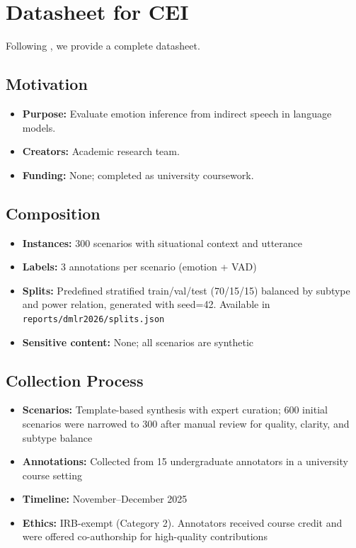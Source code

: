 \documentclass[twoside,11pt]{article}
\begin{document}


\clearpage

\appendix
\section{Datasheet for CEI}
\label{app:datasheet}

Following \citet{gebru2021datasheets}, we provide a complete datasheet.

\subsection{Motivation}
\begin{itemize}[leftmargin=*,noitemsep]
    \item \textbf{Purpose:} Evaluate emotion inference from indirect speech in language models.
    \item \textbf{Creators:} Academic research team.
    \item \textbf{Funding:} None; completed as university coursework.
\end{itemize}

\subsection{Composition}
\begin{itemize}[leftmargin=*,noitemsep]
    \item \textbf{Instances:} 300 scenarios with situational context and utterance
    \item \textbf{Labels:} 3 annotations per scenario (emotion + VAD)
    \item \textbf{Splits:} Predefined stratified train/val/test (70/15/15) balanced by subtype and power relation, generated with seed=42. Available in \texttt{reports/dmlr2026/splits.json}
    \item \textbf{Sensitive content:} None; all scenarios are synthetic
\end{itemize}

\subsection{Collection Process}
\begin{itemize}[leftmargin=*,noitemsep]
    \item \textbf{Scenarios:} Template-based synthesis with expert curation; 600 initial scenarios were narrowed to 300 after manual review for quality, clarity, and subtype balance
    \item \textbf{Annotations:} Collected from 15 undergraduate annotators in a university course setting
    \item \textbf{Timeline:} November--December 2025
    \item \textbf{Ethics:} IRB-exempt (Category 2). Annotators received course credit and were offered co-authorship for high-quality contributions
\end{itemize}
\end{document}
